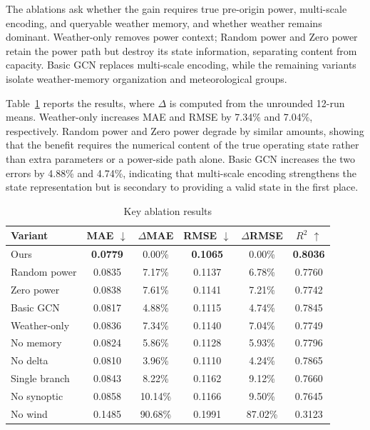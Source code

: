 The ablations ask whether the gain requires true pre-origin power, multi-scale encoding, and queryable weather memory, and whether weather remains dominant. Weather-only removes power context; Random power and Zero power retain the power path but destroy its state information, separating content from capacity. Basic GCN replaces multi-scale encoding, while the remaining variants isolate weather-memory organization and meteorological groups.

Table~\ref{tab:ablation-short} reports the results, where \(\Delta\) is computed from the unrounded 12-run means. Weather-only increases MAE and RMSE by 7.34\% and 7.04\%, respectively. Random power and Zero power degrade by similar amounts, showing that the benefit requires the numerical content of the true operating state rather than extra parameters or a power-side path alone. Basic GCN increases the two errors by 4.88\% and 4.74\%, indicating that multi-scale encoding strengthens the state representation but is secondary to providing a valid state in the first place.

\begin{table}[htbp]
\caption{Key ablation results}
\begin{center}
\footnotesize
\setlength{\tabcolsep}{2pt}
\begin{tabular}{lccccc}
\hline
Variant & MAE \(\downarrow\) & \(\Delta\)MAE & RMSE \(\downarrow\) & \(\Delta\)RMSE & \(R^2\) \(\uparrow\) \\
\hline
Ours & \textbf{0.0779} & 0.00\% & \textbf{0.1065} & 0.00\% & \textbf{0.8036} \\
Random power & 0.0835 & 7.17\% & 0.1137 & 6.78\% & 0.7760 \\
Zero power & 0.0838 & 7.61\% & 0.1141 & 7.21\% & 0.7742 \\
Basic GCN & 0.0817 & 4.88\% & 0.1115 & 4.74\% & 0.7845 \\
Weather-only & 0.0836 & 7.34\% & 0.1140 & 7.04\% & 0.7749 \\
No memory & 0.0824 & 5.86\% & 0.1128 & 5.93\% & 0.7796 \\
No delta & 0.0810 & 3.96\% & 0.1110 & 4.24\% & 0.7865 \\
Single branch & 0.0843 & 8.22\% & 0.1162 & 9.12\% & 0.7660 \\
No synoptic & 0.0858 & 10.14\% & 0.1166 & 9.50\% & 0.7645 \\
No wind & 0.1485 & 90.68\% & 0.1991 & 87.02\% & 0.3123 \\
\hline
\end{tabular}
\label{tab:ablation-short}
\end{center}
\end{table}

